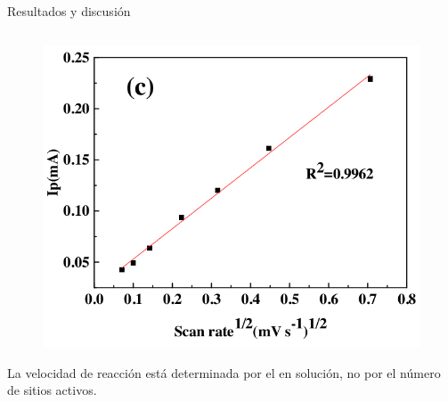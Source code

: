 \documentclass[handout]{beamer}
\begin{document}
\begin{frame}{Resultados y discusi\'on}
\begin{columns}
\begin{column}{0.6\textwidth}
			\begin{figure}[h]
				\centering
				\includegraphics[width=0.6\linewidth]{sources/scan2}
			\end{figure}
			La velocidad de reacci\'on est\'a determinada por el  en soluci\'on, no por el n\'umero de sitios activos.
		\end{column}
	\end{columns}
\end{frame}
\end{document}
